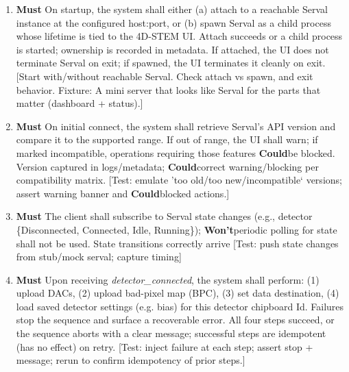 \documentclass[10pt]{article}
\newcommand{\PriorityTag}[2]{%
  \colorbox{#2!25}{\footnotesize\textsf{\textbf{#1}}}\hspace{0.6em}}
\newcommand{\must}{\leavevmode\PriorityTag{Must}{green}}
\newcommand{\could}{\leavevmode\PriorityTag{Could}{cyan}}
\newcommand{\wont}{\leavevmode\PriorityTag{Won't}{red}}
\newcounter{reqgrp}[section] %
\newcounter{reqno}
\newcommand{\reqprefix}{GEN}
\newenvironment{requirements}[1]{%
  \renewcommand{\reqprefix}{#1}%
  \refstepcounter{reqgrp}%
  \setcounter{reqno}{0}%
  \begin{enumerate}[leftmargin=*]
}{\end{enumerate}}
\begin{document}
\begin{requirements}{SRV}

\item \must {}
  {On startup, the system shall either (a) attach to a reachable Serval instance at the configured host:port, or (b) spawn Serval as a child process whose lifetime is tied to the 4D-STEM UI.}
  {Attach succeeds or a child process is started; ownership is recorded in metadata. If attached, the UI does not terminate Serval on exit; if spawned, the UI terminates it cleanly on exit.}
  [Start with/without reachable Serval. Check attach vs spawn, and exit behavior. Fixture: A mini server that looks like Serval for the parts that matter (dashboard + status).]

\item \must {}
  {On initial connect, the system shall retrieve Serval's API version and compare it to the supported range. If out of range, the UI shall warn; if marked incompatible, operations requiring those features \could be blocked.}
  {Version captured in logs/metadata; \could correct warning/blocking per compatibility matrix.}
  [Test: emulate 'too old/too new/incompatible` versions; assert warning banner and \could blocked actions.]

\item \must {}
  {The client shall subscribe to Serval state changes (e.g., detector \{Disconnected, Connected, Idle, Running\}); \wont periodic polling for state shall not be used.}
  {State transitions correctly arrive}
  [Test: push state changes from stub/mock serval; capture timing]

\item \must {}
  {Upon receiving \emph{detector\_connected}, the system shall perform: (1) upload DACs, (2) upload bad-pixel map (BPC), (3) set data destination, (4) load saved detector settings (e.g. bias) for this detector chipboard Id. Failures stop the sequence and surface a recoverable error.}
  {All four steps succeed, or the sequence aborts with a clear message; successful steps are idempotent (has no effect) on retry.}
  [Test: inject failure at each step; assert stop + message; rerun to confirm idempotency of prior steps.]


\end{requirements}
\end{document}
